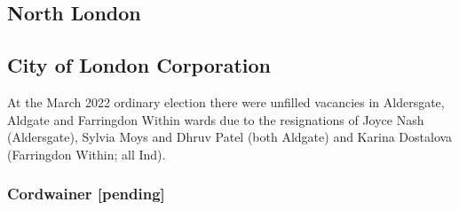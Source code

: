 \documentclass[a4paper,openany]{book}
\begin{document}
\begin{resultsiii}

%
%
%
%
%

\section{North London}

\subsection*{City of London Corporation}

At the March 2022 ordinary election there were unfilled vacancies in Aldersgate, Aldgate and Farringdon Within wards due to the resignations of Joyce Nash (Aldersgate), Sylvia Moys and Dhruv Patel (both Aldgate) and Karina Dostalova (Farringdon Within; all Ind).%
%
%

\subsubsection*{Cordwainer \hspace*{\fill}\nolinebreak[1]%
	\enspace\hspace*{\fill}
	[pending]}



\end{resultsiii}
\end{document}
